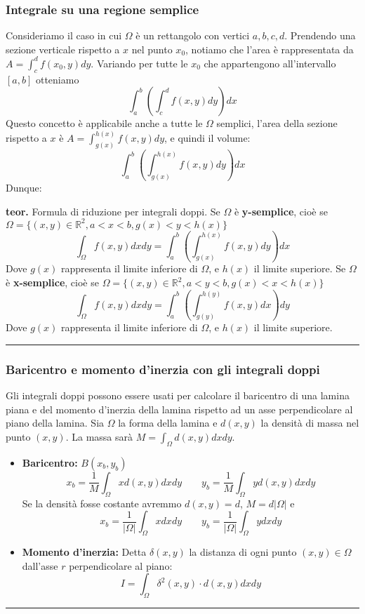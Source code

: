 \subsubsection{Integrale su una regione semplice}
Consideriamo il caso in cui $\Omega$ è un rettangolo con vertici $a, b, c, d$.\newline
Prendendo una sezione verticale rispetto a $x$ nel punto $x_0$, notiamo che l'area è rappresentata da $A = \int_{c}^{d}f(x_0, y)dy$. Variando per tutte le $x_0$ che appartengono all'intervallo $[a,b]$ otteniamo
\[
    \int_{a}^{b} \left(\int_{c}^{d}f(x,y) dy \right)dx
\]
Questo concetto è applicabile anche a tutte le $\Omega$ semplici, l'area della sezione rispetto a $x$ è $A = \int_{g(x)}^{h(x)}f(x,y)dy$, e quindi il volume:
\[
    \int_{a}^{b}\left(\int_{g(x)}^{h(x)}f(x,y) dy \right)dx
\]
Dunque:\newline
\begin{tcolorbox}
\textbf{teor.} Formula di riduzione per integrali doppi.\newline
Se $\Omega$ è \textbf{y-semplice}, cioè se $\Omega = \{(x,y) \in \mathbb{R}^2, a< x<b, g(x)<y<h(x)\}$
\[
    \int_{\Omega}f(x,y)dxdy = \int_{a}^{b}\left(\int_{g(x)}^{h(x)}f(x,y)dy\right)dx
\]
Dove $g(x)$ rappresenta il limite inferiore di $\Omega$, e $h(x)$ il limite superiore.\newline
Se $\Omega$ è \textbf{x-semplice}, cioè se $\Omega = \{(x,y) \in \mathbb{R}^2, a< y<b, g(x)<x<h(x)\}$
\[
    \int_{\Omega}f(x,y)dxdy = \int_{a}^{b}\left(\int_{g(y)}^{h(y)}f(x,y)dx\right)dy
\]
Dove $g(x)$ rappresenta il limite inferiore di $\Omega$, e $h(x)$ il limite superiore.\newline
\end{tcolorbox}
\rule{\textwidth}{0,4pt}
\subsubsection{Baricentro e momento d'inerzia con gli integrali doppi}
Gli integrali doppi possono essere usati per calcolare il baricentro di una lamina piana e del momento d'inerzia della lamina rispetto ad un asse perpendicolare al piano della lamina.\newline
Sia $\Omega$ la forma della lamina e $d(x,y)$ la densità di massa nel punto $(x,y)$. La massa sarà $M = \int_{\Omega}d(x,y) dxdy$.
\begin{tcolorbox}
\begin{itemize}
    \item \textbf{Baricentro:} $B(x_b, y_b)$
    \[
        x_b = \frac{1}{M}\int_\Omega x d(x,y) dx dy \quad \quad y_b =\frac{1}{M}\int_\Omega y d(x,y) dxdy 
    \]
    Se la densità fosse costante avremmo $d(x,y) = d$, $M = d |\Omega|$ e
    \[
        x_b = \frac{1}{|\Omega|}\int_\Omega x dx dy \quad \quad y_b =\frac{1}{|\Omega|}\int_\Omega y dxdy
    \]
    \item \textbf{Momento d'inerzia:}\newline
    Detta $\delta(x,y)$ la distanza di ogni punto $(x,y) \in \Omega$ dall'asse $r$ perpendicolare al piano:
    \[
        I = \int_\Omega \delta^2(x,y) \cdot  d(x,y) dxdy
    \]
\end{itemize}
\end{tcolorbox}
\rule{\textwidth}{0,4pt}
